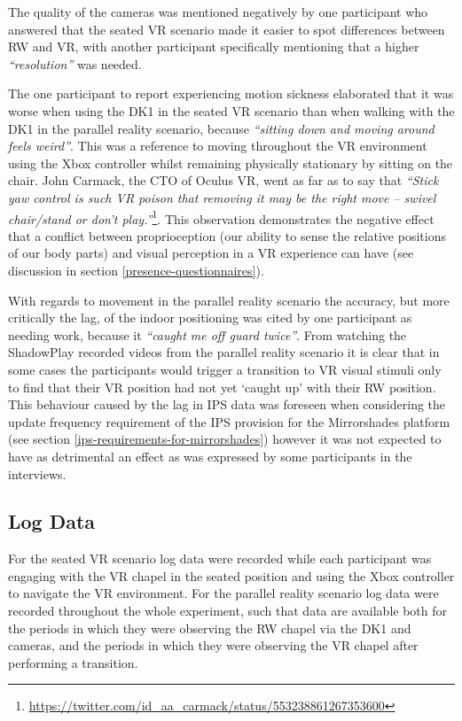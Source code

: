 The quality of the cameras was mentioned negatively by one participant who answered that the seated VR scenario made it easier to spot differences between RW and VR, with another participant specifically mentioning that a higher \textit{``resolution''} was needed.

The one participant to report experiencing motion sickness elaborated that it was worse when using the DK1 in the seated VR scenario than when walking with the DK1 in the parallel reality scenario, because \textit{``sitting down and moving around feels weird''}. This was a reference to moving throughout the VR environment using the Xbox controller whilst remaining physically stationary by sitting on the chair. John Carmack, the CTO of Oculus VR, went as far as to say that \textit{``Stick yaw control is such VR poison that removing it may be the right move -- swivel chair/stand or don't play.''}\footnote{\url{https://twitter.com/id_aa_carmack/status/553238861267353600}}. This observation demonstrates the negative effect that a conflict between proprioception (our ability to sense the relative positions of our body parts) and visual perception in a VR experience can have (see discussion in section \ref{presence-questionnaires}).

With regards to movement in the parallel reality scenario the accuracy, but more critically the lag, of the indoor positioning was cited by one participant as needing work, because it \textit{``caught me off guard twice''}. From watching the ShadowPlay recorded videos from the parallel reality scenario it is clear that in some cases the participants would trigger a transition to VR visual stimuli only to find that their VR position had not yet `caught up' with their RW position. This behaviour caused by the lag in IPS data was foreseen when considering the update frequency requirement of the IPS provision for the Mirrorshades platform (see section \ref{ips-requirements-for-mirrorshades}) however it was not expected to have as detrimental an effect as was expressed by some participants in the interviews.


\subsection{Log Data}

For the seated VR scenario log data were recorded while each participant was engaging with the VR chapel in the seated position and using the Xbox controller to navigate the VR environment. For the parallel reality scenario log data were recorded throughout the whole experiment, such that data are available both for the periods in which they were observing the RW chapel via the DK1 and cameras, and the periods in which they were observing the VR chapel after performing a transition.

